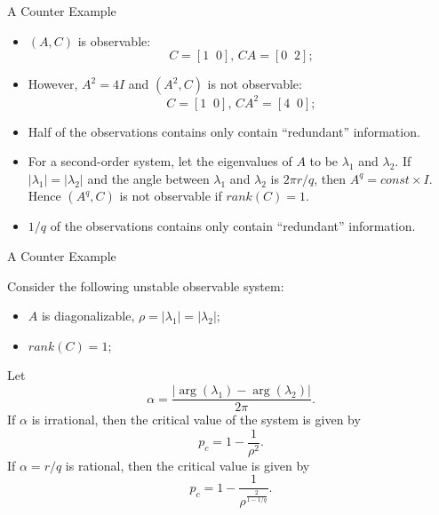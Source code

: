 \documentclass[10pt]{beamer}
\begin{document}
  \begin{frame}{A Counter Example}
    \begin{itemize} 
      \item $(A,C)$ is observable:
	\begin{displaymath}
	 C = [1\;\;0],\,CA = [0\;\;2]; 
	\end{displaymath}
      \item However, $A^2 =4I$ and $(A^2,C)$ is not observable:
	\begin{displaymath}
	 C = [1\;\;0],\,CA^2 = [4\;\;0]; 
	\end{displaymath}
      \item Half of the observations contains only contain ``redundant'' information.
      \item For a second-order system, let the eigenvalues of $A$ to be $\lambda_1$ and $\lambda_2$. If $|\lambda_1| = |\lambda_2|$ and the angle between $\lambda_1$ and $\lambda_2$ is $2\pi r/q$, then $A^q = const\times I$. Hence $(A^q,C)$ is not observable if $rank(C) = 1$.
      \item $1/q$ of the observations contains only contain ``redundant'' information.
    \end{itemize}
  \end{frame}

  \begin{frame}{A Counter Example}
    \begin{theorem}
      Consider the following unstable observable system:
      \begin{itemize}
	\item  $A$ is diagonalizable, $\rho = |\lambda_1| = |\lambda_2| $;
	\item  $rank(C) = 1$;
      \end{itemize}
      Let
      \begin{displaymath}
	\alpha = \frac{|\arg(\lambda_1)-\arg(\lambda_2)|}{2\pi}.	
      \end{displaymath}
      If $\alpha$ is irrational, then the critical value of the system is given by
      \begin{displaymath}
	p_c = 1-\frac{1}{\rho^2}.
      \end{displaymath}
      If $\alpha = r/q$ is rational, then the critical value is given by
      \begin{displaymath}
	p_c = 1-\frac{1}{\rho^{\frac{2}{1-1/q}}}.
      \end{displaymath}
    \end{theorem}
  \end{frame}
\end{document}

